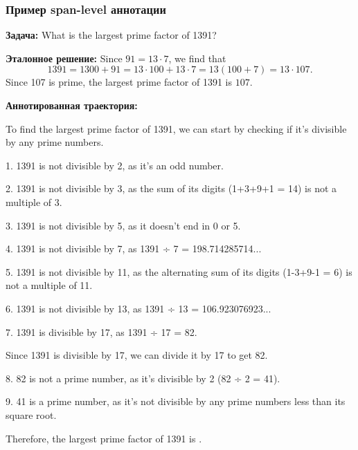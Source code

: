 \documentclass{beamer}
\newcommand{\hall}[1]{\colorbox{red!20}{#1}}
\begin{document}
\begin{frame}[fragile]
  \frametitle{Пример span-level аннотации}
  \tiny

  \textbf{Задача:} What is the largest prime factor of 1391?

  \vspace{0.3em}
  \textbf{Эталонное решение:} Since $91 = 13\cdot 7$, we find that
  \[
  1391 = 1300 + 91 = 13\cdot 100 + 13\cdot 7 = 13(100+7) = 13\cdot 107.
  \]
  Since 107 is prime, the largest prime factor of 1391 is $\boxed{107}$.

  \vspace{0.3em}
  \textbf{Аннотированная траектория:}

  To find the largest prime factor of 1391, we can start by checking if it's divisible by any prime numbers.

  1. 1391 is not divisible by 2, as it's an odd number.

  2. 1391 is not divisible by 3, as the sum of its digits (1+3+9+1 = 14) is not a multiple of 3.

  3. 1391 is not divisible by 5, as it doesn't end in 0 or 5.

  4. 1391 is not divisible by 7, as 1391 ÷ 7 = 198.714285714...

  5. 1391 is not divisible by 11, as the alternating sum of its digits (1-3+9-1 = 6) is not a multiple of 11.

  6. 1391 is \hall{not} divisible by 13, as 1391 ÷ 13 = \hall{106.923076923}...

  7. 1391 is \hall{divisible} by 17, as 1391 ÷ 17 = \hall{82}.

  Since 1391 is divisible by 17, we can divide it by 17 to get 82.

  8. 82 is not a prime number, as it's divisible by 2 (82 ÷ 2 = 41).

  9. 41 is a prime number, as it's not divisible by any prime numbers less than its square root.

  Therefore, the largest prime factor of 1391 is \boxed{\hall{41}}.
\end{frame}
\end{document}
